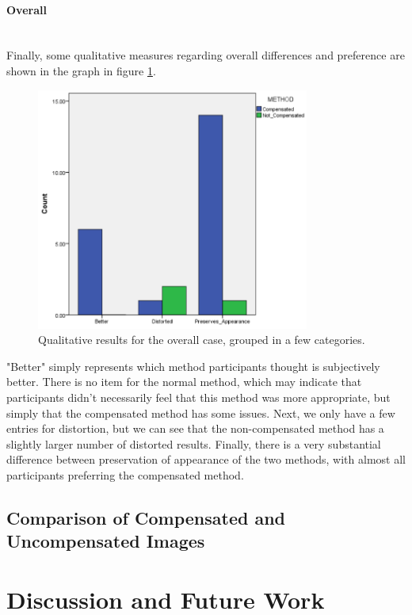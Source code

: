 \documentclass[]{article}
\begin{document}
\paragraph{Overall}\mbox{}\\

Finally, some qualitative measures regarding overall differences and preference are shown in the graph in figure \ref{fig:QualitativeOverall}.


\begin{figure}[!h]
    \centering
    \includegraphics[width=0.80\textwidth]{figures/results/QualitativeOverall.PNG}
    \caption{Qualitative results for the overall case, grouped in a few categories.}
    \label{fig:QualitativeOverall}
\end{figure}

"Better" simply represents which method participants thought is subjectively better. There is no item for the normal method, which may indicate that participants didn't necessarily feel that this method was more appropriate, but simply that the compensated method has some issues. Next, we only have a few entries for distortion, but we can see that the non-compensated method has a slightly larger number of distorted results. Finally, there is a very substantial difference between preservation of appearance of the two methods, with almost all participants preferring the compensated method.

\clearpage
\subsection{Comparison of Compensated and Uncompensated Images}
\clearpage
\section{Discussion and Future Work}
\end{document}
